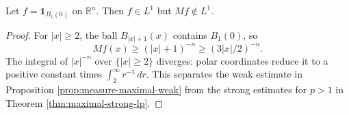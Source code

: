 \begin{example}\label{ex:maximal-endpoint-failure}
Let $f=\mathbf1_{B_1(0)}$ on $\mathbb R^n$. Then $f\in L^1$ but $Mf\notin L^1$.
\end{example}
\begin{proof}
For $|x|\geq2$, the ball $B_{|x|+1}(x)$ contains $B_1(0)$, so
\[
 Mf(x)\geq (|x|+1)^{-n}\geq(3|x|/2)^{-n}.
\]
The integral of $|x|^{-n}$ over $\{|x|\geq2\}$ diverges: polar coordinates reduce it to a positive constant times $\int_2^\infty r^{-1}\,dr$. This separates the weak estimate in Proposition \ref{prop:measure-maximal-weak} from the strong estimates for $p>1$ in Theorem \ref{thm:maximal-strong-lp}.
\end{proof}
